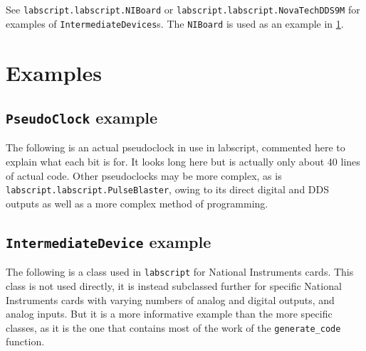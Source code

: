 \documentclass[a4paper,11pt,titlepage]{article}
\begin{document}
See \texttt{labscript.labscript.NIBoard} or \texttt{labscript.labscript.NovaTechDDS9M} for examples of \texttt{IntermediateDevices}s. The \texttt{NIBoard} is used as an example in \ref{sec:examples}.


\section{Examples}\label{sec:examples}
\subsection{\texttt{PseudoClock} example}

The following is an actual pseudoclock in use in labscript, commented here to explain what each bit is for. It looks long here but is actually only about 40 lines of actual code. Other pseudoclocks may be more complex, as is \texttt{labscript.labscript.PulseBlaster}, owing to its direct digital and DDS outputs as well as a more complex method of programming.


\subsection{\texttt{IntermediateDevice} example}

The following is a class used in \texttt{labscript} for National Instruments cards. This class is not used directly, it is instead subclassed further for specific National Instruments cards with varying numbers of analog and digital outputs, and analog inputs. But it is a more informative example than the more specific classes, as it is the one that contains most of the work of the \texttt{generate\_code} function.

\end{document}
